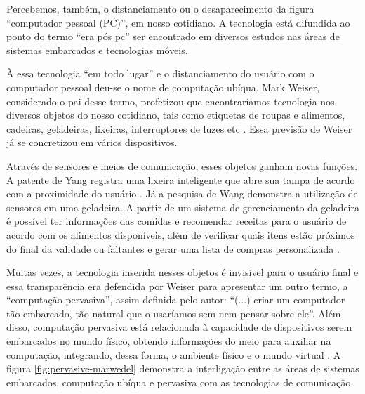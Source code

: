 Percebemos, também, o distanciamento ou o desaparecimento da figura ``computador
pessoal (PC)'', em nosso cotidiano. A tecnologia está difundida ao ponto do
termo  ``era pós pc'' ser encontrado em diversos estudos
\cite{bonilla2011inclusao,  chen2011pospc, press1999personal} nas áreas de
sistemas embarcados e  tecnologias móveis.

À essa tecnologia ``em todo lugar'' e o distanciamento do usuário com o 
computador pessoal deu-se o nome de computação ubíqua. Mark Weiser, considerado 
o pai desse termo, profetizou que encontraríamos tecnologia nos diversos objetos
do nosso cotidiano, tais como etiquetas de roupas e alimentos, cadeiras, 
geladeiras, lixeiras, interruptores de luzes etc \cite{weiser1991computer}. Essa 
previsão de Weiser já se concretizou em vários dispositivos.

Através de sensores e meios de comunicação, esses objetos ganham novas funções.
A patente de Yang registra uma lixeira inteligente que abre sua tampa de acordo
com a proximidade do usuário \cite{yang2005trash}. Já a pesquisa de Wang
demonstra a utilização de sensores em uma geladeira. A partir de um sistema de
gerenciamento da geladeira é possível ter informações das comidas e recomendar
receitas para o usuário de acordo com os alimentos disponíveis, além de 
verificar quais itens estão próximos do final da validade ou faltantes e gerar 
uma lista de compras personalizada \cite{hou2013}.


Muitas vezes, a tecnologia inserida nesses objetos é invisível para o usuário
final e essa transparência era defendida por Weiser para apresentar um outro
termo, a ``computação pervasiva'', assim definida pelo autor: ``(...) criar  um
computador tão embarcado, tão natural que o usaríamos sem nem pensar sobre
ele''. Além disso, computação pervasiva está relacionada à capacidade de
dispositivos serem embarcados no mundo físico, obtendo informações do meio para
auxiliar na computação, integrando, dessa forma, o ambiente físico e o mundo
virtual \cite{bolsoni2009computaccao, de2003computaccao}. A figura  
\ref{fig:pervasive-marwedel} demonstra a interligação entre as áreas de sistemas
embarcados, computação ubíqua e pervasiva com as tecnologias de comunicação.

